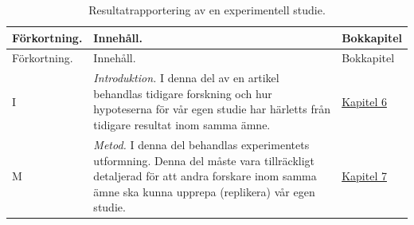 \documentclass[
]{book}
\begin{document}
\begin{longtable}[]{@{}lll@{}}
\caption{\label{tab:tab-02-08-3-1-01}Resultatrapportering av en experimentell studie.}\tabularnewline
\toprule
\begin{minipage}[b]{0.05\columnwidth}\raggedright
Förkortning.\strut
\end{minipage} & \begin{minipage}[b]{0.78\columnwidth}\raggedright
Innehåll.\strut
\end{minipage} & \begin{minipage}[b]{0.08\columnwidth}\raggedright
Bokkapitel\strut
\end{minipage}\tabularnewline
\midrule
\endfirsthead
\toprule
\begin{minipage}[b]{0.05\columnwidth}\raggedright
Förkortning.\strut
\end{minipage} & \begin{minipage}[b]{0.78\columnwidth}\raggedright
Innehåll.\strut
\end{minipage} & \begin{minipage}[b]{0.08\columnwidth}\raggedright
Bokkapitel\strut
\end{minipage}\tabularnewline
\midrule
\endhead
\begin{minipage}[t]{0.05\columnwidth}\raggedright
I\strut
\end{minipage} & \begin{minipage}[t]{0.78\columnwidth}\raggedright
\emph{Introduktion.} I denna del av en artikel behandlas tidigare forskning och hur hypoteserna för vår egen studie har härletts från tidigare resultat inom samma ämne.\strut
\end{minipage} & \begin{minipage}[t]{0.08\columnwidth}\raggedright
\protect\hyperlink{chap06}{Kapitel 6}\strut
\end{minipage}\tabularnewline
\begin{minipage}[t]{0.05\columnwidth}\raggedright
M\strut
\end{minipage} & \begin{minipage}[t]{0.78\columnwidth}\raggedright
\emph{Metod.} I denna del behandlas experimentets utformning. Denna del måste vara tillräckligt detaljerad för att andra forskare inom samma ämne ska kunna upprepa (replikera) vår egen studie.\strut
\end{minipage} & \begin{minipage}[t]{0.08\columnwidth}\raggedright
\protect\hyperlink{chap07}{Kapitel 7}\strut
\end{minipage}\tabularnewline

\end{longtable}
\end{document}

